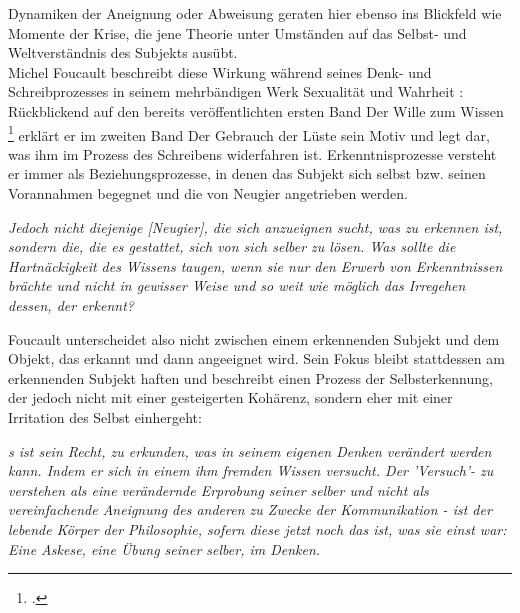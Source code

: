 Dynamiken der Aneignung oder Abweisung geraten
hier ebenso ins Blickfeld wie Momente der Krise, die jene Theorie unter
Umständen auf das Selbst- und Weltverständnis des Subjekts ausübt. \\
 Michel
Foucault beschreibt diese Wirkung während seines Denk- und Schreibprozesses in
seinem mehrbändigen Werk \glqq Sexualität und Wahrheit\grqq\footnotemark
{}: Rückblickend auf den
bereits veröffentlichten ersten Band \glqq Der Wille zum Wissen \grqq
\footnotemark \footcitetext{foucault} erklärt er im
zweiten Band \glqq Der Gebrauch der Lüste\grqq\footnotemark
{} sein Motiv und legt dar, was ihm im
Prozess des Schreibens widerfahren ist. Erkenntnisprozesse versteht er immer als Beziehungsprozesse, in denen das Subjekt sich selbst bzw. seinen Vorannahmen begegnet und die von Neugier angetrieben werden. 

\begin{myenv}
  \textit{Jedoch \glqq [...] nicht diejenige [Neugier], die sich anzueignen
  sucht, was zu erkennen ist, sondern die, die es gestattet, sich von sich
selber zu lösen. Was sollte die Hartnäckigkeit des Wissens taugen, wenn sie nur
den Erwerb von Erkenntnissen brächte und nicht in gewisser Weise und so weit
wie möglich das Irregehen dessen, der erkennt?\grqq} \footnotemark
{}
\end{myenv}

Foucault unterscheidet also nicht zwischen einem erkennenden Subjekt und dem Objekt, das erkannt und dann angeeignet wird. Sein Fokus bleibt stattdessen am erkennenden Subjekt haften und beschreibt einen Prozess der Selbsterkennung, der jedoch nicht mit einer gesteigerten Kohärenz, sondern eher mit einer Irritation des Selbst einhergeht: 

\begin{myenv}
  \textit{ 
    \glqq [E]s ist sein Recht, zu erkunden, was in seinem eigenen Denken verändert
    werden kann. Indem er sich in einem ihm fremden Wissen versucht. Der
    'Versuch'- zu verstehen als eine verändernde Erprobung seiner selber und 
    nicht als vereinfachende Aneignung des anderen zu Zwecke der Kommunikation
    - ist der lebende Körper der Philosophie, sofern diese jetzt noch das ist,
    was sie einst war: Eine Askese, eine Übung seiner selber, im Denken.\grqq\footnotemark
  }

\end{myenv}

